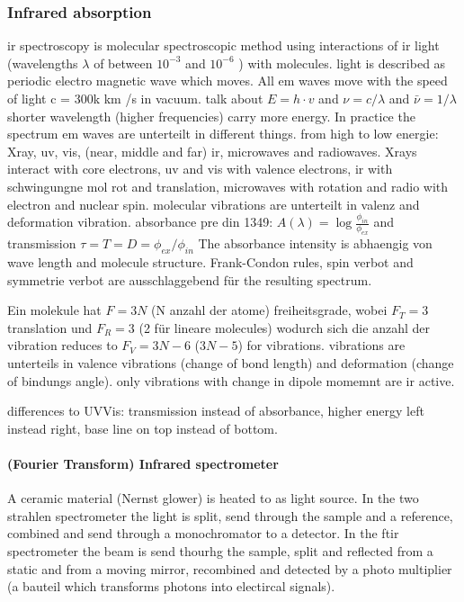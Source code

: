 \subsubsection{Infrared absorption}

\Gls{ir} spectroscopy is molecular spectroscopic method using interactions of \gls{ir} light (wavelengths $\lambda$ of between $10^{-3}$ and $10^{-6}$ \m{}) with molecules. \cite{Schwedt2008}
light is described as periodic electro magnetic wave which moves. 
All \gls{em} waves move with the speed of light c = 300k km /s in vacuum. 
talk about $E=h\cdot v$ and $\nu=c/\lambda$ and $\bar{\nu}=1/\lambda$
shorter wavelength (higher frequencies) carry more energy. 
In practice the spectrum \gls{em} waves are unterteilt in different things. 
from high to low energie: Xray, \gls{uv}, vis, (near, middle and far) \gls{ir}, microwaves and radiowaves. 
Xrays interact with core electrons, \gls{uv} and vis with valence electrons, ir with schwingungne mol rot and translation, microwaves with rotation and radio with electron and nuclear spin. 
molecular vibrations are unterteilt in valenz and deformation vibration.
absorbance pre din 1349: $A(\lambda) = \log{\frac{\phi_{in}}{\phi_{ex}}}$ and transmission $\tau =T=D= \phi_{ex}/\phi_{in}$
The absorbance intensity is abhaengig von wave length and molecule structure. 
Frank-Condon rules, spin verbot and symmetrie verbot are ausschlaggebend für the resulting spectrum. 

Ein molekule hat $F=3N$ (N anzahl der atome) freiheitsgrade, wobei $F_T=3$ translation und $F_R=3$ (2 für lineare molecules) wodurch sich die anzahl der vibration reduces to $F_V=3N-6$ ($3N-5$) for vibrations. 
vibrations are unterteils in valence vibrations (change of bond length) and deformation (change of bindungs angle). 
only vibrations with change in dipole momemnt are \gls{ir} active. 

differences to UVVis: transmission instead of absorbance, higher energy left instead right, base line on top instead of bottom.
\paragraph{(Fourier Transform) Infrared spectrometer}
 A ceramic material (Nernst glower) is heated to  as light source. 
 In the two strahlen spectrometer the light is split, send through the sample and a reference, combined and send through a monochromator to a detector. 
 In the \gls{ft}\gls{ir} spectrometer the beam is send thourhg the sample, split and reflected from a static and from a moving mirror, recombined and detected by a photo multiplier (a bauteil which transforms photons into electircal signals).


